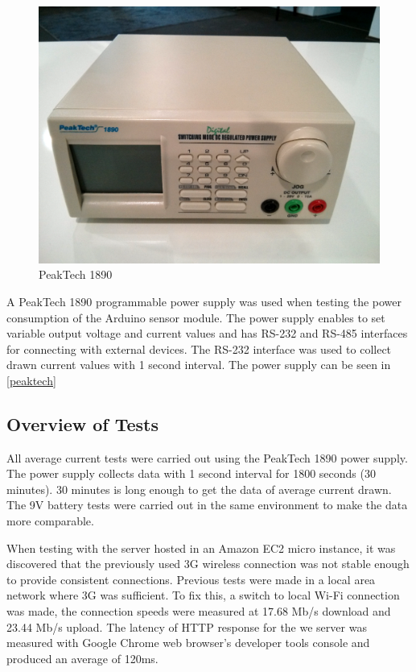 \begin{figure}[h]
\centering
\includegraphics[scale=0.48]{4/figures/peaktech.pdf}
\caption{PeakTech 1890}
\label{peaktech}
\end{figure}

A PeakTech 1890 programmable power supply was used when testing the power consumption of the Arduino sensor module. The power supply enables to set variable output voltage and current values and has RS-232 and RS-485 interfaces for connecting with external devices. The RS-232 interface was used to collect drawn current values with 1 second interval. The power supply can be seen in \autoref{peaktech}

\subsection{Overview of Tests}

All average current tests were carried out using the PeakTech 1890 power supply. The power supply collects data with 1 second interval for 1800 seconds (30 minutes). 30 minutes is long enough to get the data of average current drawn. The 9V battery tests were carried out in the same environment to make the data more comparable. 

When testing with the server hosted in an Amazon EC2 micro instance, it was discovered that the previously used 3G wireless connection was not stable enough to provide consistent connections. Previous tests were made in a local area network where 3G was sufficient. To fix this, a switch to local Wi-Fi connection was made, the connection speeds were measured at 17.68 Mb/s download and 23.44 Mb/s upload. The latency of HTTP response for the we server was measured with Google Chrome web browser's developer tools console and produced an average of 120ms. 

